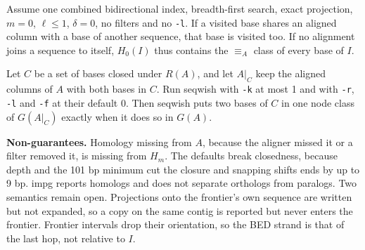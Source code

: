 \begin{proposition}[Closedness]\label{prop:closed}
Assume one combined bidirectional index, breadth-first search, exact projection, $m=0$, $\ell\le 1$, $\delta=0$, no filters and no \texttt{-l}.
If a visited base shares an aligned column with a base of another sequence, that base is visited too.
If no alignment joins a sequence to itself, $H_0(I)$ thus contains the $\equiv_A$ class of every base of $I$.
\end{proposition}

\begin{proposition}[Restriction]\label{prop:restrict}
Let $C$ be a set of bases closed under $R(A)$, and let $A|_C$ keep the aligned columns of $A$ with both bases in $C$.
Run seqwish with \texttt{-k} at most 1 and with \texttt{-r}, \texttt{-l} and \texttt{-f} at their default 0.
Then seqwish puts two bases of $C$ in one node class of $G(A|_C)$ exactly when it does so in $G(A)$.
\end{proposition}

\textbf{Non-guarantees.}
Homology missing from $A$, because the aligner missed it or a filter removed it, is missing from $H_m$.
The defaults break closedness, because depth and the 101 bp minimum cut the closure and snapping shifts ends by up to 9 bp.
impg reports homologs and does not separate orthologs from paralogs.
Two semantics remain open.
Projections onto the frontier's own sequence are written but not expanded, so a copy on the same contig is reported but never enters the frontier.
Frontier intervals drop their orientation, so the BED strand is that of the last hop, not relative to $I$.

